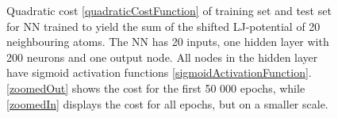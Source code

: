 \documentclass[twoside,english]{uiofysmaster}
\begin{document}

\begin{figure}
\centering
{}
\caption{Quadratic cost \eqref{quadraticCostFunction} of training set and test set for NN trained to yield
	 the sum of the shifted LJ-potential of 20 neighbouring atoms. 
	 The NN has 20 inputs, one hidden layer 
	 with 200 neurons and one output node. All nodes in the hidden layer have sigmoid activation functions 
	 \eqref{sigmoidActivationFunction}. \autoref{zoomedOut} shows the cost for the first 50 000 epochs, while
	 \autoref{zoomedIn} displays the cost for all epochs, but on a smaller scale.}	 
\label{fig:trainingManyNeighbourNN}
\end{figure}
\end{document}
